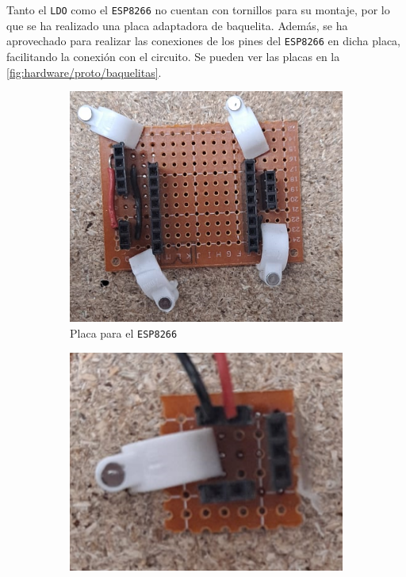 Tanto el \texttt{LDO} como el \texttt{ESP8266} no cuentan con tornillos para su montaje, por lo que se ha realizado una placa adaptadora de baquelita. Además, se ha aprovechado para realizar las conexiones de los pines del \texttt{ESP8266} en dicha placa, facilitando la conexión con el circuito. Se pueden ver las placas en la \autoref{fig:hardware/proto/baquelitas}.

\begin{figure}[H]
    \centering
    \begin{subfigure}[b]{0.35\textwidth}
        \includegraphics[width=\textwidth]{images/2-hardware/baquelitaESP.png}
        \caption{Placa para el \texttt{ESP8266}}
    \end{subfigure}
    \hspace{2cm}
    \begin{subfigure}[b]{0.35\textwidth}
        \includegraphics[width=\textwidth]{images/2-hardware/baquelitaLDO.png}

\end{subfigure}
\end{figure}
